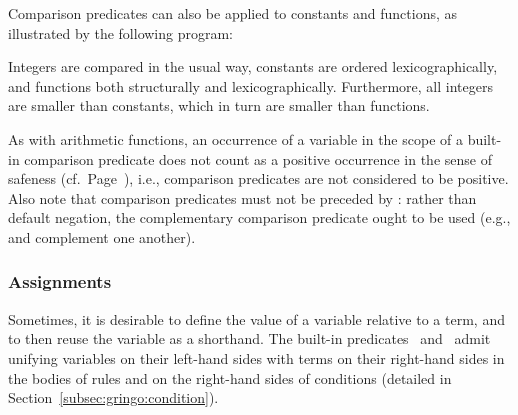 \begin{example}\label{ex:symb:pred}
Comparison predicates can also be applied to constants and functions,
as illustrated by the following program:%
%

%
Integers are compared in the usual way, constants are ordered lexicographically,
and functions both structurally and lexicographically.
Furthermore, all integers are smaller than constants,
which in turn are smaller than functions.
\eexample
\end{example}

\begin{Note}
As with arithmetic functions,
an occurrence of a variable in the scope of a built-in comparison predicate
does not count as a positive occurrence in the sense of safeness (cf.\ Page~\pageref{pg:safe}),
i.e.,
comparison predicates are not considered to be positive.
Also note that comparison predicates must not be preceded by :
rather than default negation,
the complementary comparison predicate ought to be used
(e.g., \code{<} and \code{>=} complement one another).
%
\end{Note}

\subsubsection{Assignments}\label{subsec:gringo:assign}

Sometimes, it is desirable to define the value of a variable relative
to a term, and to then reuse the variable as a shorthand.
The built-in predicates~\code{=} and~\code{:=} admit unifying
variables on their left-hand sides with terms on their right-hand sides
in the bodies of rules and on the right-hand sides of conditions
(detailed in Section~\ref{subsec:gringo:condition}).

